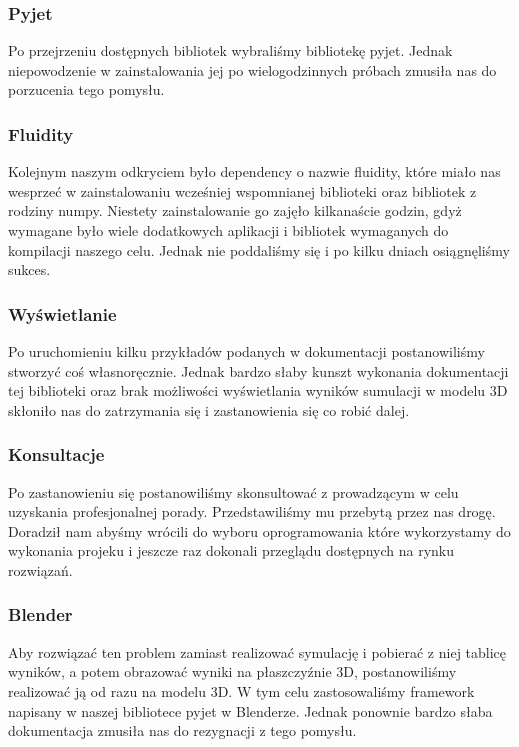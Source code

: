 \documentclass{article}
\begin{document}
	\medskip
	\vspace{4mm}
	\subsubsection{Pyjet}
	\noindent Po przejrzeniu dostępnych bibliotek wybraliśmy bibliotekę pyjet. Jednak niepowodzenie w zainstalowania jej po wielogodzinnych próbach zmusiła nas do porzucenia tego pomysłu.
	
	\medskip
	\vspace{4mm}
	\subsubsection{Fluidity}
	\noindent Kolejnym naszym odkryciem było dependency o nazwie fluidity, które miało nas wesprzeć w zainstalowaniu wcześniej wspomnianej biblioteki oraz bibliotek z rodziny numpy. Niestety zainstalowanie go zajęło kilkanaście godzin, gdyż wymagane było wiele dodatkowych aplikacji i bibliotek wymaganych do kompilacji naszego celu. Jednak nie poddaliśmy się i po kilku dniach osiągnęliśmy sukces. 
	
	\medskip
	\vspace{4mm}
	\subsubsection{Wyświetlanie}
	\noindent Po uruchomieniu kilku przykładów podanych w dokumentacji postanowiliśmy stworzyć coś własnoręcznie. Jednak bardzo słaby kunszt wykonania dokumentacji tej biblioteki oraz brak możliwości wyświetlania wyników sumulacji w modelu 3D skłoniło nas  do zatrzymania się i zastanowienia się co robić dalej.
	
	\medskip
	\vspace{4mm}
	\subsubsection{Konsultacje}
	\noindent Po zastanowieniu się postanowiliśmy skonsultować z prowadzącym w celu uzyskania profesjonalnej porady. Przedstawiliśmy mu przebytą przez nas drogę. Doradził nam abyśmy wrócili do wyboru oprogramowania które wykorzystamy do wykonania projeku i jeszcze raz dokonali przeglądu dostępnych na rynku rozwiązań. 
	
	
	\medskip
	\vspace{4mm}
	\subsubsection{Blender}
	\noindent Aby rozwiązać ten problem zamiast realizować symulację i pobierać z niej tablicę wyników, a potem obrazować wyniki na płaszczyźnie 3D, postanowiliśmy realizować ją od razu na modelu 3D. W tym celu zastosowaliśmy framework napisany w naszej bibliotece pyjet w Blenderze. Jednak ponownie bardzo słaba dokumentacja zmusiła nas do rezygnacji z tego pomysłu.
	
\end{document}

